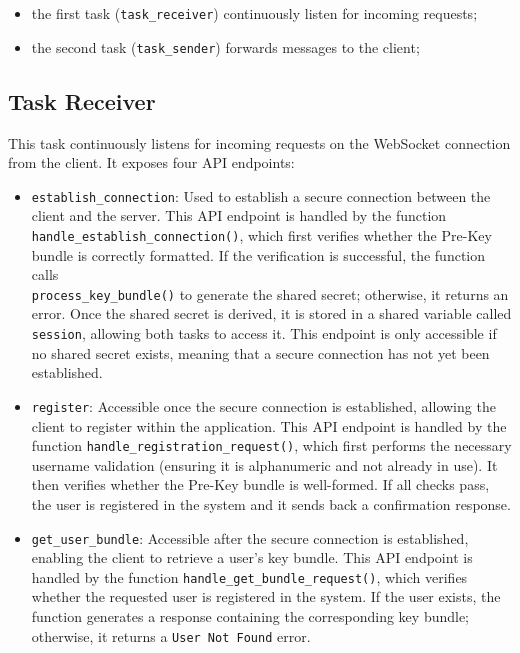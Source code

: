 \begin{itemize}
    \item the first task (\texttt{task\_receiver}) continuously listen for incoming requests;
    \item the second task (\texttt{task\_sender}) forwards messages to the client;
\end{itemize}

\subsection{Task Receiver}
\label{subsec:TaskReceiver}

This task continuously listens for incoming requests on the WebSocket connection from the client. It exposes four API endpoints:

\begin{itemize}
    \item \texttt{establish\_connection}: Used to establish a secure connection between the client and the server. This API endpoint is handled by the function \\
    \texttt{handle\_establish\_connection()}, which first verifies whether the Pre-Key bundle is correctly formatted. If the verification is successful, the function calls  \\
    \texttt{process\_key\_bundle()} to generate the shared secret; otherwise, it returns an error. Once the shared secret is derived, it is stored in a shared variable called \texttt{session}, allowing both tasks to access it. This endpoint is only accessible if no shared secret exists, meaning that a secure connection has not yet been established.

    \item \texttt{register}: Accessible once the secure connection is established, allowing the client to register within the application. This API endpoint is handled by the function \texttt{handle\_registration\_request()}, which first performs the necessary username validation (ensuring it is alphanumeric and not already in use). It then verifies whether the Pre-Key bundle is well-formed. If all checks pass, the user is registered in the system and it sends back a confirmation response.

    \item \texttt{get\_user\_bundle}: Accessible after the secure connection is established, enabling the client to retrieve a user's key bundle. This API endpoint is handled by the function \texttt{handle\_get\_bundle\_request()}, which verifies whether the requested user is registered in the system. If the user exists, the function generates a response containing the corresponding key bundle; otherwise, it returns a \texttt{User Not Found} error.


\end{itemize}
